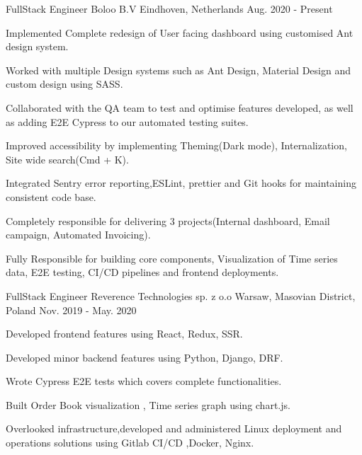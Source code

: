 \begin{cventries}

  \cventry
    {FullStack Engineer}
    {Boloo B.V}
    {Eindhoven, Netherlands}
    {Aug. 2020 - Present}
    {
      \begin{cvitems}
        \item {Implemented Complete redesign of User facing dashboard using customised Ant design system.}
        \item {Worked with multiple Design systems such as Ant Design, Material Design and custom design using SASS.}
        \item {Collaborated with the QA team to test and optimise features developed, as well as adding E2E Cypress to our automated testing suites.}
        \item {Improved accessibility by implementing Theming(Dark mode), Internalization, Site wide search(Cmd + K).}
        \item {Integrated Sentry error reporting,ESLint, prettier and Git hooks for maintaining consistent code base.}
        \item {Completely responsible for delivering 3 projects(Internal dashboard, Email campaign, Automated Invoicing).}
        \item {Fully Responsible for building core components, Visualization of Time series data, E2E testing, CI/CD pipelines and frontend deployments.}
      \end{cvitems}
    }

  \cventry
    {FullStack Engineer}
    {Reverence Technologies sp. z o.o}
    {Warsaw, Masovian District, Poland}
    {Nov. 2019 - May. 2020}
    {
      \begin{cvitems}
        \item { Developed frontend features using React, Redux, SSR.}
        \item { Developed minor backend features using Python, Django, DRF.}
        \item { Wrote Cypress E2E tests which covers complete functionalities.}
        \item { Built Order Book visualization , Time series graph using chart.js.}
        \item { Overlooked infrastructure,developed and administered Linux deployment and
        operations solutions using Gitlab CI/CD ,Docker, Nginx.}
        \end{cvitems}
    }


\end{cventries}
